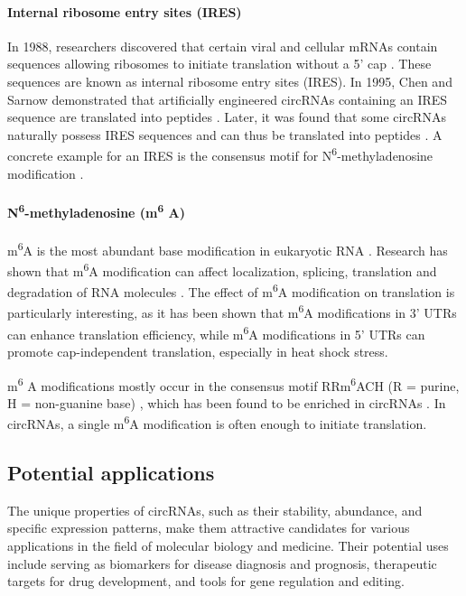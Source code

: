 \paragraph{Internal ribosome entry sites (IRES)} In 1988, researchers
discovered that certain viral and cellular mRNAs contain sequences allowing
ribosomes to initiate translation without a 5' cap
\supercite{pelletier_internal_1988, jang_segment_1988}.
These sequences are known as internal ribosome entry sites (IRES).
In 1995, Chen and Sarnow demonstrated that artificially engineered circRNAs
containing an IRES sequence are translated into peptides
\supercite{chen_initiation_1995}.
Later, it was found that some circRNAs naturally possess IRES sequences and can
thus be translated into peptides
\supercite{chen_expanding_2020,legnini_circ-znf609_2017,pamudurti_translation_2017}.
A concrete example for an IRES is the consensus motif for
N\textsuperscript{6}-methyladenosine modification
\supercite{yang_extensive_2017}.

\paragraph{N\textsuperscript{6}-methyladenosine (m\textsuperscript{6}
    A)}  m\textsuperscript{6}A is the most abundant base modification in eukaryotic
RNA \supercite{yang_extensive_2017,li_pivotal_2014,wei_methylated_1975}.
Research has shown that m\textsuperscript{6}A modification can affect
localization, splicing, translation and degradation of RNA molecules
\supercite{yue_rna_2015,meyer_dynamic_2014}.
The effect of m\textsuperscript{6}A modification on translation is particularly
interesting, as it has been shown that m\textsuperscript{6}A modifications in
3' UTRs can enhance translation
efficiency\supercite{wang_n6-methyladenosine_2015}, while m\textsuperscript{6}A
modifications in 5' UTRs can promote cap-independent translation, especially in
heat shock stress\supercite{zhou_dynamic_2015,meyer_5_2015}.

m\textsuperscript{6}
A modifications mostly occur in the consensus motif RRm\textsuperscript{6}ACH
(R = purine, H = non-guanine base)
\supercite{csepany_sequence_1990,harper_sequence_1990}, which has been found to
be enriched in circRNAs \supercite{yang_extensive_2017}.
In circRNAs, a single m\textsuperscript{6}A modification is often enough to
initiate translation\supercite{yang_extensive_2017}.

\subsection{Potential applications}
The unique properties of circRNAs, such as their stability, abundance, and
specific expression patterns, make them attractive candidates for various
applications in the field of molecular biology and medicine.
Their potential uses include serving as biomarkers for disease diagnosis and
prognosis, therapeutic targets for drug development, and tools for gene
regulation and editing.

